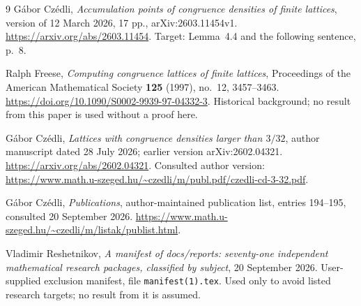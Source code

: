 \documentclass[11pt,a4paper]{article}
\numberwithin{equation}{section}
\theoremstyle{definition}
\theoremstyle{remark}
\begin{document}
\clearpage
{}
{}
\begin{thebibliography}{9}
G\'abor Cz\'edli,
\emph{Accumulation points of congruence densities of finite lattices},
version of 12 March 2026, 17 pp., arXiv:2603.11454v1.
\url{https://arxiv.org/abs/2603.11454}.
Target: Lemma~4.4 and the following sentence, p.~8.

Ralph Freese,
\emph{Computing congruence lattices of finite lattices},
Proceedings of the American Mathematical Society \textbf{125} (1997), no.~12,
3457--3463.
\url{https://doi.org/10.1090/S0002-9939-97-04332-3}.
Historical background; no result from this paper is used without a proof here.

G\'abor Cz\'edli,
\emph{Lattices with congruence densities larger than $3/32$},
author manuscript dated 28 July 2026; earlier version arXiv:2602.04321.
\url{https://arxiv.org/abs/2602.04321}.
Consulted author version:
\url{https://www.math.u-szeged.hu/~czedli/m/publ.pdf/czedli-cd-3-32.pdf}.

G\'abor Cz\'edli,
\emph{Publications}, author-maintained publication list,
entries 194--195, consulted 20 September 2026.
\url{https://www.math.u-szeged.hu/~czedli/m/listak/publist.html}.

Vladimir Reshetnikov,
\emph{A manifest of docs/reports: seventy-one independent mathematical research
packages, classified by subject}, 20 September 2026.
User-supplied exclusion manifest, file \texttt{manifest(1).tex}.
Used only to avoid listed research targets; no result from it is assumed.
\end{thebibliography}
\end{document}
